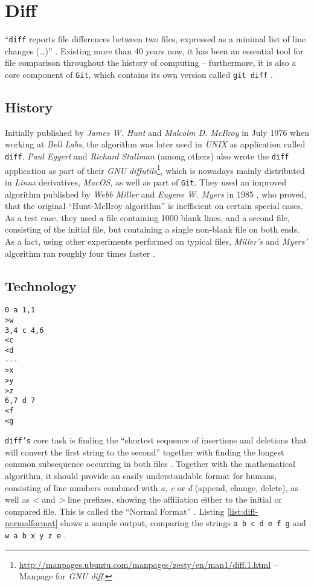 \section{Diff}
\label{sec:diff}

``\texttt{diff} reports file differences between two files, expressed as a minimal list of line changes (\ldots)'' \cite[1]{Hunt1976}. Existing more than 40 years now, it has been an essential tool for file comparison throughout the history of computing -- furthermore, it is also a core component of \texttt{Git}, which contains its own version called \texttt{git diff} \cite[108]{loeliger2012version}.

\subsection{History}
\label{sec:diff-history}
Initially published by \emph{James W. Hunt} and \emph{Malcolm D. McIlroy} in July 1976 when working at \emph{Bell Labs}, the algorithm was later used in \emph{UNIX} as application called \texttt{diff}. \emph{Paul Eggert} and \emph{Richard Stallman} (among others) also wrote the \texttt{diff} application as part of their \emph{GNU diffutils}\footnote{\url{http://manpages.ubuntu.com/manpages/zesty/en/man1/diff.1.html} -- Manpage for \emph{GNU diff}.}, which is nowadays mainly distributed in \emph{Linux} derivatives, \emph{MacOS}, as well as part of \texttt{Git}. They used an improved algorithm published by \emph{Webb Miller} and \emph{Eugene W. Myers} in 1985 \cite[3]{mackenzie2003comparing}, who proved, that the original ``Hunt-McIlroy algorithm'' is inefficient on certain special cases. As a test case, they used a file containing 1000 blank lines, and a second file, consisting of the initial file, but containing a single non-blank file on both ends. As a fact, using other experiments performed on typical files, \emph{Miller's} and \emph{Myers'} algorithm ran roughly four times faster \cite[p. 1034f]{miller1985file}.

\subsection{Technology}
\label{sec:diff-technology}

\begin{lstlisting}[label={list:diff-normalformat}, caption=sample.diff]
0 a 1,1
>w
3,4 c 4,6
<c
<d
---
>x
>y
>z
6,7 d 7
<f
<g
\end{lstlisting}

\texttt{diff's} core task is finding the ``shortest sequence of insertions and deletions that will convert the first string to the second'' \cite[1025]{miller1985file} together with finding the longest common subsequence occurring in both files \cite[2]{Hunt1976}. Together with the mathematical algorithm, it should provide an easily understandable format for humans, consisting of line numbers combined with \emph{a, c} or \emph{d} (append, change, delete), as well as \emph{<} and \emph{>} line prefixes, showing the affiliation either to the initial or compared file. This is called the ``Normal Format'' \cite[12]{mackenzie2003comparing}. Listing \ref{list:diff-normalformat} shows a sample output, comparing the strings \texttt{a b c d e f g} and \texttt{w a b x y z e} \cite[p. 1f]{Hunt1976}.
